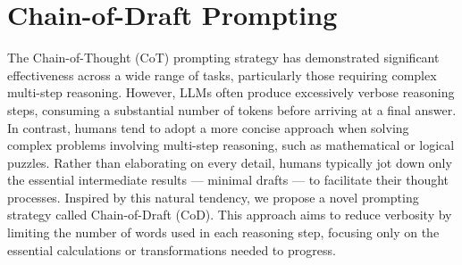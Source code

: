 \section{Chain-of-Draft Prompting}

The Chain-of-Thought (CoT) prompting strategy has demonstrated significant effectiveness across a wide range of tasks, particularly those requiring complex multi-step reasoning.
However, LLMs often produce excessively verbose reasoning steps, consuming a substantial number of tokens before arriving at a final answer.
In contrast, humans tend to adopt a more concise approach when solving complex problems involving multi-step reasoning, such as mathematical or logical puzzles. Rather than elaborating on every detail, humans typically jot down only the essential intermediate results — minimal drafts — to facilitate their thought processes. Inspired by this natural tendency, we propose a novel prompting strategy called Chain-of-Draft (CoD). This approach aims to reduce verbosity by limiting the number of words used in each reasoning step, focusing only on the essential calculations or transformations needed to progress.

